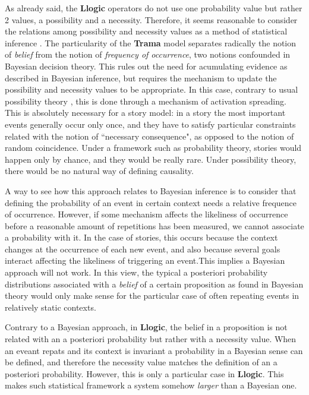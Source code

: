 \documentclass[
		twoside,openright,titlepage,numbers=noenddot,manychapters,
		headinclude,%
                footinclude=false,cleardoublepage=empty,
                BCOR=5mm,
		fontsize=11pt, %
                 enabledeprecatedfontcommands]{scrreprt}
\begin{document}
 As already said, the \textbf{Llogic} operators do not use one probability value but rather 2 values, a  possibility and a necessity.  Therefore, it seems reasonable to consider the relations among possibility and necessity values as a method of statistical inference \cite[]{dubois2006pta}. The particularity of the \textbf{Trama} model separates radically the notion of \emph{belief} from the notion of \emph{frequency of occurrence}, two notions confounded in Bayesian decision theory. This rules out the need for acumulating evidence as described in Bayesian inference, but requires the mechanism to update the possibility and necessity values to be appropriate. In this case, contrary to usual possibility theory  \cite[]{zadeh1999fuzzy}, this is done through a mechanism of activation spreading.  This is absolutely necessary for a story model: in a story the most important events generally occur only once, and they have to satisfy particular constraints related with the notion of ``necessary consequence", as opposed to the notion of random coincidence. Under a  framework such as probability theory, stories would happen only by chance, and they would be really rare. Under possibility theory, there would be no natural way of defining causality.

A way to see how this approach relates to Bayesian inference is to consider that defining the probability of an event in certain context needs a relative frequence of occurrence. However, if some mechanism affects the likeliness of occurrence before a reasonable amount of repetitions has been measured, we cannot associate a probability with it. In the case of stories, this occurs because the context changes at the occurrence of each new event, and also because several goals interact  affecting the likeliness of triggering an event.This implies a Bayesian approach will not work. In this view, the typical a posteriori probability distributions associated with a \emph{belief} of a certain proposition as found in Bayesian theory would only make sense for the particular case of often repeating events in relatively static contexts. 

Contrary to a Bayesian approach, in \textbf{Llogic}, the belief in a proposition is not related with an a posteriori probability but rather with a necessity value. When an eveant repats and its context is invariant a probability in a Bayesian sense can be defined, and therefore the necessity value matches the definition of an a posteriori probability. However, this is only a particular case in \textbf{Llogic}. This makes such statistical framework a system somehow \emph{larger} than a Bayesian one.  
\end{document}
